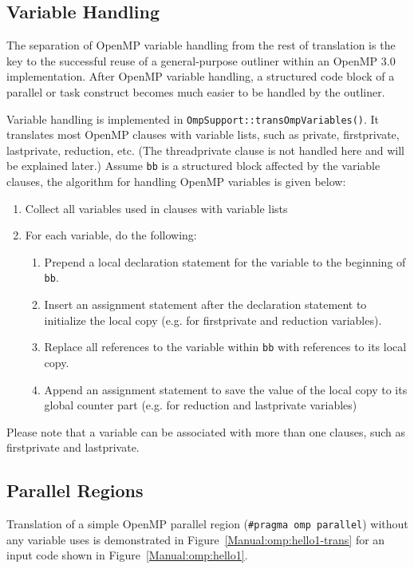 \subsection{Variable Handling}
The separation of OpenMP variable handling from the rest of translation is
the key to the successful reuse of a general-purpose outliner within an OpenMP 3.0 implementation. 
After OpenMP variable handling, a structured code block of a parallel or task construct becomes much easier to be handled by the outliner.

Variable handling is implemented in \lstinline{OmpSupport::transOmpVariables()}. 
It translates most OpenMP clauses with variable lists, such as private, firstprivate, lastprivate, reduction, etc.
(The threadprivate clause is not handled here and will be explained later.)
Assume \lstinline{bb} is a structured block affected by the variable clauses, the algorithm for handling OpenMP variables is given below:
\begin{enumerate}
\item Collect all variables used in clauses with variable lists
\item For each variable, do the following:
\begin{enumerate}
\item Prepend a local declaration statement for the variable to the beginning of \lstinline{bb}.
\item Insert an assignment statement after the declaration statement to initialize the local copy (e.g. for firstprivate and reduction variables).
\item Replace all references to the variable within \lstinline{bb} with references to its local copy.
\item Append an assignment statement to save the value of the local copy to its global counter part (e.g. for reduction and lastprivate variables)
\end{enumerate}
\end{enumerate}
Please note that a variable can be associated with more than one clauses, such as firstprivate and lastprivate. 


\subsection{Parallel Regions}

Translation of a simple OpenMP parallel region 
(\lstinline{#pragma omp parallel}) without any variable uses is demonstrated in
Figure~\ref{Manual:omp:hello1-trans} for an input code shown in
Figure~\ref{Manual:omp:hello1}.

